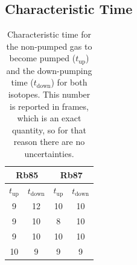 \documentclass[10pt]{article}
\begin{document}
	\subsection{Characteristic Time} 
	\begin{table}[h!]
		\centering
\begin{tabular}{|cc|cc|}
\hline
\multicolumn{2}{|c|}{Rb85} & \multicolumn{2}{c|}{Rb87} \\ \hline
\multicolumn{1}{|c|}{$t_{\text{up}}$} & $t_{\text{down}}$ & \multicolumn{1}{c|}{$t_{\text{up}}$} & $t_{\text{down}}$ \\ \hline
\multicolumn{1}{|c|}{9} & 12 & \multicolumn{1}{c|}{10} & 10 \\
\multicolumn{1}{|c|}{9} & 10 & \multicolumn{1}{c|}{8} & 10 \\
\multicolumn{1}{|c|}{9} & 10 & \multicolumn{1}{c|}{10} & 10 \\
\multicolumn{1}{|c|}{10} & 9 & \multicolumn{1}{c|}{9} & 9 \\ \hline
\end{tabular}%
\caption{Characteristic time for the non-pumped gas to become pumped (\( t_\text{up}
\)) and the down-pumping time (\( t_\text{down} \)) for both isotopes. This number is
reported in frames, which is an exact quantity, so for that reason there are no
uncertainties.}
\label{characteristic-time}
	\end{table}
\end{document}
